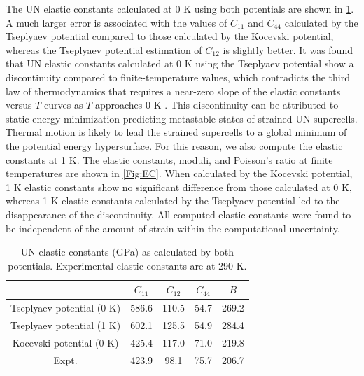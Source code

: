 \documentclass[preprint, 12pt]{elsarticle}
\begin{document}
The UN elastic constants calculated at 0 K using both potentials are shown in \cref{Tab:ElasticConst}. A much larger error is associated with the values of $C_{11}$ and $C_{44}$ calculated by the Tseplyaev potential compared to those calculated by the Kocevski potential, whereas the Tseplyaev potential estimation of $C_{12}$ is slightly better. It was found that UN elastic constants calculated at 0 K using the Tseplyaev potential show a discontinuity compared to finite-temperature values, which contradicts the third law of thermodynamics that requires a near-zero slope of the elastic constants versus $T$ curves as $T$ approaches 0 K \cite{Wachtman1961}. This discontinuity can be attributed to static energy minimization predicting metastable states of strained UN supercells. Thermal motion is likely to lead the strained supercells to a global minimum of the potential energy hypersurface. For this reason, we also compute the elastic constants at 1 K. The elastic constants, moduli, and Poisson's ratio at finite temperatures are shown in \cref{Fig:EC}. When calculated by the Kocevski potential, 1 K elastic constants show no significant difference from those calculated at 0 K, whereas 1 K elastic constants calculated by the Tseplyaev potential led to the disappearance of the discontinuity. All computed elastic constants were found to be independent of the amount of strain within the computational uncertainty.

\begin{table}[h!]
    \centering
    \footnotesize
    \caption{UN elastic constants (GPa) as calculated by both potentials. Experimental elastic constants are at 290 K.}
    \begin{tabular}{ccccc}
    \hline
                               & $C_{11}$ & $C_{12}$ & $C_{44}$ & $B$   \\
    \hline
    Tseplyaev potential (0 K)          & 586.6    & 110.5    & 54.7     & 269.2 \\
    Tseplyaev potential (1 K)          & 602.1    & 125.5    & 54.9     & 284.4 \\
    Kocevski potential (0 K) & 425.4    & 117.0    & 71.0     & 219.8 \\
    Expt. \cite{Salleh1986}    & 423.9    & 98.1     & 75.7     & 206.7 \\
    \hline
    \end{tabular}
    \label{Tab:ElasticConst}
\end{table}
\end{document}
